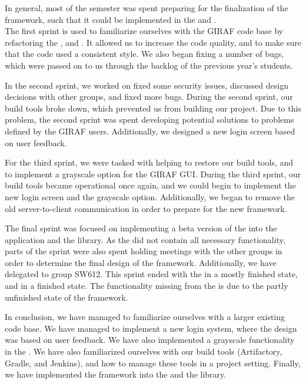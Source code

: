 In general, most of the semester was spent preparing for the finalization of the
 framework, such that it could be implemented in the
 and .\\
The first sprint is used to familiarize ourselves with the GIRAF code base by
refactoring the ,  and
. It allowed us to increase the code quality, and to make
sure that the code used a consistent style. We also began fixing a number of
bugs, which were passed on to us through the backlog of the previous year's
students.\nl



In the second sprint, we worked on fixed some security issues, discussed design
decisions with other groups, and fixed more bugs. During the second sprint, our
build tools broke down, which prevented us from building our project. Due to
this problem, the second sprint was spent developing potential solutions to
problems defined by the GIRAF users. Additionally, we designed a new login
screen based on user feedback.\nl

For the third sprint, we were tasked with helping to restore our build tools,
and to implement a grayscale option for the GIRAF GUI. During the third sprint,
our build tools became operational once again, and we could begin to implement
the new login screen and the grayscale option. Additionally, we began to remove
the old server-to-client communication in order to prepare for the new
 framework.\nl

The final sprint was focused on implementing a beta version of the
 into the  application and the
 library. As the  did not
contain all necessary functionality, parts of the sprint were also spent holding
meetings with the other groups in order to determine the final design of the
 framework. Additionally, we have delegated 
to group SW612. This sprint ended with the  in a mostly finished
state, and  in a finished state. The functionality
missing from the  is due to the partly unfinished state of the
 framework.\nl

In conclusion, we have managed to familiarize ourselves with a larger existing
code base. We have managed to implement a new login system, where the design was
based on user feedback. We have also implemented a grayscale
functionality in the . We have also familiarized ourselves
with our build tools (Artifactory, Gradle, and Jenkins), and how to manage these tools in
a project setting. Finally, we have implemented the  framework into
the  and the  library.
